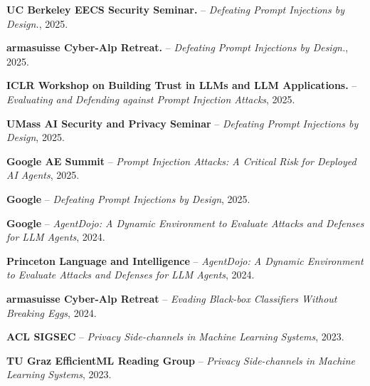 
\begin{cvparagraph}
\vspace{5.0mm}
\begin{cvitems} %
    \item{\textbf{UC Berkeley EECS Security Seminar.} -- \textit{Defeating Prompt Injections by Design.}, 2025.}
    \item{\textbf{armasuisse Cyber-Alp Retreat.} -- \textit{Defeating Prompt Injections by Design.}, 2025.}
    \item{\textbf{ICLR Workshop on Building Trust in LLMs and LLM Applications.} -- \textit{Evaluating and Defending against Prompt Injection Attacks}, 2025.}
    \item{\textbf{UMass AI Security and Privacy Seminar} -- \textit{Defeating Prompt Injections by Design}, 2025.}
    \item{\textbf{Google AE Summit} -- \textit{Prompt Injection Attacks: A Critical Risk for Deployed AI Agents}, 2025.}
    \item{\textbf{Google} -- \textit{Defeating Prompt Injections by Design}, 2025.}
    \item{\textbf{Google} -- \textit{AgentDojo: A Dynamic Environment to Evaluate Attacks and Defenses for LLM Agents}, 2024.}
    \item{\textbf{Princeton Language and Intelligence} -- \textit{AgentDojo: A Dynamic Environment to Evaluate Attacks and Defenses for LLM Agents}, 2024.}
    \item{\textbf{armasuisse Cyber-Alp Retreat} -- \textit{Evading Black-box Classifiers Without Breaking Eggs}, 2024.}
    \item{\textbf{ACL SIGSEC} -- \textit{Privacy Side-channels in Machine Learning Systems}, 2023.}
    \item{\textbf{TU Graz EfficientML Reading Group} -- \textit{Privacy Side-channels in Machine Learning Systems}, 2023.}
\end{cvitems}
\end{cvparagraph}